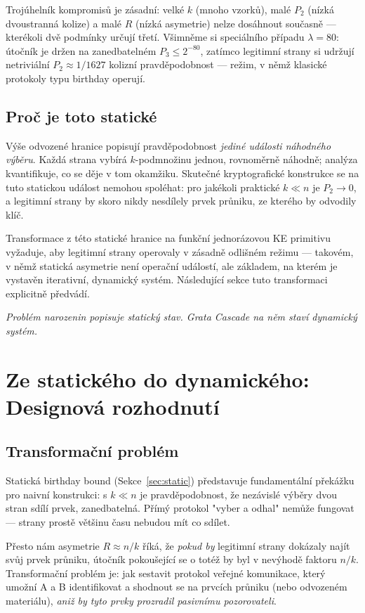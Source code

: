 \documentclass[11pt,a4paper]{article}
\begin{document}
Trojúhelník kompromisů je zásadní: velké $k$ (mnoho vzorků), malé $P_2$ (nízká dvoustranná kolize) a malé $R$ (nízká asymetrie) nelze dosáhnout současně --- kterékoli dvě podmínky určují třetí. Všimněme si speciálního případu $\lambda = 80$: útočník je držen na zanedbatelném $P_3 \leq 2^{-80}$, zatímco legitimní strany si udržují netriviální $P_2 \approx 1/1627$ kolizní pravděpodobnost --- režim, v němž klasické protokoly typu birthday operují.

\subsection{Proč je toto statické}\label{sec:why-static}

Výše odvozené hranice popisují pravděpodobnost \emph{jediné události náhodného výběru}. Každá strana vybírá $k$-podmnožinu jednou, rovnoměrně náhodně; analýza kvantifikuje, co se děje v tom okamžiku. Skutečné kryptografické konstrukce se na tuto statickou událost nemohou spoléhat: pro jakékoli praktické $k \ll n$ je $P_2 \to 0$, a legitimní strany by skoro nikdy nesdílely prvek průniku, ze kterého by odvodily klíč.

Transformace z této statické hranice na funkční jednorázovou KE primitivu vyžaduje, aby legitimní strany operovaly v zásadně odlišném režimu --- takovém, v němž statická asymetrie není operační událostí, ale základem, na kterém je vystavěn iterativní, dynamický systém. Následující sekce tuto transformaci explicitně předvádí.

\medskip
\noindent\textit{Problém narozenin popisuje statický stav. Grata Cascade na něm staví dynamický systém.}

\section{Ze statického do dynamického: Designová rozhodnutí}\label{sec:transformation}

\subsection{Transformační problém}

Statická birthday bound (Sekce~\ref{sec:static}) představuje fundamentální překážku pro naivní konstrukci: s $k \ll n$ je pravděpodobnost, že nezávislé výběry dvou stran sdílí prvek, zanedbatelná. Přímý protokol "vyber a odhal" nemůže fungovat --- strany prostě většinu času nebudou mít co sdílet.

Přesto nám asymetrie $R \approx n/k$ říká, že \emph{pokud by} legitimní strany dokázaly najít svůj prvek průniku, útočník pokoušející se o totéž by byl v nevýhodě faktoru $n/k$. Transformační problém je: jak sestavit protokol veřejné komunikace, který umožní A a B identifikovat a shodnout se na prvcích průniku (nebo odvozeném materiálu), \emph{aniž by tyto prvky prozradil pasivnímu pozorovateli}.
\end{document}
